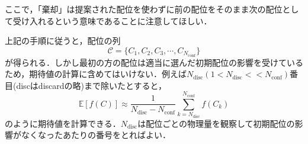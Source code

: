 \documentclass[a4paper,11pt]{jsreport}
\begin{document}
ここで，「棄却」は提案された配位を使わずに前の配位をそのまま次の配位として受け入れるという意味であることに注意してほしい．\par
上記の手順に従うと，配位の列
\begin{equation}
  \mathcal{C} = \{ C_1,C_2,C_3,\cdots,C_{N_{\text{conf}}} \}
\end{equation}
が得られる．しかし最初の方の配位は適当に選んだ初期配位の影響を受けているため，期待値の計算に含めてはいけない．例えば$N_{\text{disc}}(1<N_{\text{disc}}<<N_{\text{conf}})$番目(discはdiscardの略)まで除いたとすると，
\begin{equation}
  \mathbb{E}[f(C)] \approx \frac{1}{N_{\text{disc}} - N_{\text{conf}}}\sum_{k=N_{\text{disc}}}^{N_{\text{conf}}}f(C_k)
\end{equation}
のように期待値を計算できる．$N_{\text{disc}}$は配位ごとの物理量を観察して初期配位の影響がなくなったあたりの番号をとればよい．
\end{document}
